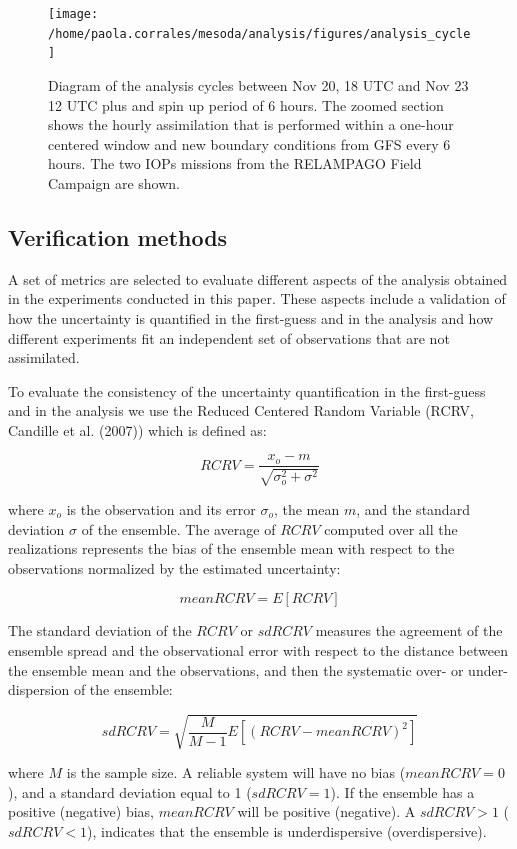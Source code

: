 \documentclass[final,5p,times,twocolumn,authoryear]{elsarticle} %
\begin{document}
\begin{figure}
\texttt{[image: /home/paola.corrales/mesoda/analysis/figures/analysis\_cycle]} \caption{Diagram of the analysis cycles between Nov 20, 18 UTC and Nov 23 12 UTC plus and spin up period of 6 hours. The zoomed section shows the hourly assimilation that is performed within a one-hour centered window and new boundary conditions from GFS every 6 hours. The two IOPs missions from the RELAMPAGO Field Campaign are shown.}\label{fig:cycle}
\end{figure}

\hypertarget{verification-methods}{%
\subsection{Verification methods}\label{verification-methods}}

A set of metrics are selected to evaluate different aspects of the analysis obtained in the experiments conducted in this paper. These aspects include a validation of how the uncertainty is quantified in the first-guess and in the analysis and how different experiments fit an independent set of observations that are not assimilated.

To evaluate the consistency of the uncertainty quantification in the first-guess and in the analysis we use the Reduced Centered Random Variable (RCRV, Candille et al. (2007)) which is defined as:

\[RCRV = \frac{x_o - m}{\sqrt{\sigma_o^2 + \sigma^2}}\]

where \(x_o\) is the observation and its error \(\sigma_o\), the mean \(m\), and the standard deviation \(\sigma\) of the ensemble.
The average of \(RCRV\) computed over all the realizations represents the bias of the ensemble mean with respect to the observations normalized by the estimated uncertainty:

\[\mathit{mean RCRV} = E[RCRV]\]

The standard deviation of the \(RCRV\) or \(sd RCRV\) measures the agreement of the ensemble spread and the observational error with respect to the distance between the ensemble mean and the observations, and then the systematic over- or under- dispersion of the ensemble:

\[\mathit{sd RCRV} = \sqrt{\frac{M}{M -1}E[(\mathit{RCRV} - \mathit{mean RCRV})^2]}\]

where \(M\) is the sample size. A reliable system will have no bias (\(mean RCRV = 0\)), and a standard deviation equal to 1 (\(sd RCRV = 1\)). If the ensemble has a positive (negative) bias, \(mean RCRV\) will be positive (negative). A \(sd RCRV > 1\) (\(sd RCRV < 1\)), indicates that the ensemble is underdispersive (overdispersive).
\end{document}
